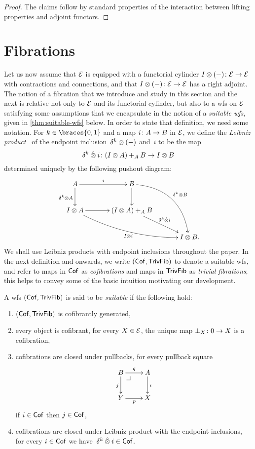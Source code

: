 \documentclass[reqno,10pt,a4paper,oneside,draft]{amsart}
\begin{document}
\begin{proof} The claims follow by standard properties of the interaction between lifting properties and adjoint functors.
\end{proof}

\section{Fibrations}
\label{sec:fib}

Let us now assume that $\catE$ is equipped with a functorial cylinder $\interval\otimes (-) \co \catE \to \catE$ with contractions and connections, and that $\interval\otimes (-) \co \catE \to \catE$ has a right adjoint.
The notion of a fibration that we introduce and study in this section and the next is relative not only to $\cal{E}$ and its functorial cylinder, but also to a wfs on $\cal{E}$ satisfying some assumptions that we encapsulate in the notion of a \emph{suitable wfs}, given in \cref{thm:suitable-wfs} below.
In order to state that definition, we need some notation.
For $k \in \braces{0, 1}$ and a map $i \co A \to B$ in $\catE$, we define the \emph{Leibniz product}~\cite{riehl-verity:reedy} of the endpoint inclusion~$\kcyl \otimes (-)$ and~$i$ to be the map
\[
\kcyl \hatotimes i \co (\interval \otimes A) +_A B \to \interval \otimes B
\]
determined uniquely by the following pushout diagram:
\begin{gather*}
\xymatrix@C=1.2cm{
  A
  \ar[r]^{i}
  \ar[d]_{\kcyl \otimes A}
&
  B
  \ar@/^2pc/[ddr]^{\kcyl \otimes B}
  \ar[d]
&\\
  \interval \otimes A
  \ar@/_1pc/[drr]_{\interval \otimes i}
  \ar[r]
&
  (\interval \otimes A) +_A B
  \ar[dr]^-{\delta^k \hatotimes i}
&\\&&
  \interval \otimes B
\rlap{.}}
\end{gather*}
We shall use Leibniz products with endpoint inclusions throughout the paper.
In the next definition and onwards, we write $(\Cof, \TrivFib)$ to denote a suitable wfs, and refer to maps in $\Cof$ as \emph{cofibrations} and maps in $\TrivFib$ as \emph{trivial fibrations}; this helps to convey some of the basic intuition motivating our development.

\begin{definition} \label{thm:suitable-wfs}
A wfs $(\Cof, \TrivFib)$ is said to be \emph{suitable} if the following hold:
\begin{enumerate}[({S}1)]
\item $(\Cof, \TrivFib)$ is cofibrantly generated,
\item every object is cofibrant, \ie for every $X \in \cal{E}$, the unique map $\bot_X \co 0 \to X$ is a cofibration,
\item cofibrations are closed under pullbacks, \ie for every pullback square
\[
\xymatrix{
  B
  \ar[d]_j
  \ar[r]^q
  \pullback{dr}
&
  A
  \ar[d]^i
\\
  Y
  \ar[r]_p
&
  X
}
\]
if $i \in \Cof$ then $j \in \Cof$,
\item cofibrations are closed under Leibniz product with the endpoint inclusions, \ie for every $i \in \Cof$ we have~$\kcyl \hatotimes i \in \Cof$.
\end{enumerate}
\end{definition}
\end{document}
